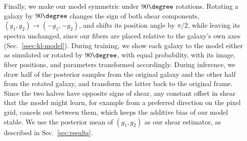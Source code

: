 Finally, we make our model symmetric under $90\degree$ rotations. Rotating a galaxy by $90\degree$ changes the sign of both shear components, $(g_1, g_2) \rightarrow (-g_1, -g_2)$, and shifts its position angle by $\pi/2$, while leaving its spectra unchanged, since our fibers are placed relative to the galaxy's own axes (Sec.~\ref{ssec:kl-model}). During training, we show each galaxy to the model either as simulated or rotated by $90\degree$, with equal probability, with its image, fiber positions, and parameters transformed accordingly. During inference, we draw half of the posterior samples from the original galaxy and the other half from the rotated galaxy, and transform the latter back to the original frame. Since the two halves have opposite signs of shear, any constant offset in shear that the model might learn, for example from a preferred direction on the pixel grid, cancels out between them, which keeps the additive bias of our model stable. We use the posterior mean of $(g_1, g_2)$ as our shear estimator, as described in Sec.~\ref{sec:results}.

